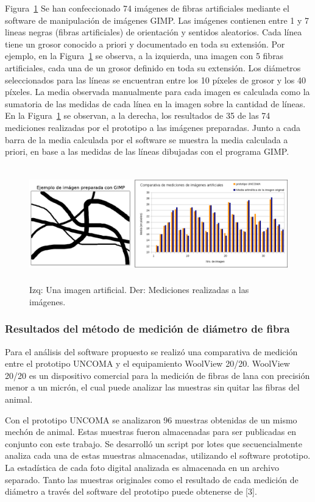 \documentclass[runningheads,a4paper]{llncs}
\begin{document}
Figura~\ref{fig:comparativa-artificial3}
Se han confeccionado 74 imágenes de fibras artificiales mediante el software de manipulación de imágenes GIMP. Las imágenes contienen entre 1 y 7 lineas negras (fibras artificiales) de orientación  y sentidos aleatorios. Cada línea tiene un grosor conocido a priori y documentado en toda su extensión. Por ejemplo, en la Figura~\ref{fig:comparativa-artificial3} se observa, a la izquierda, una imagen con 5 fibras artificiales, cada una de un grosor definido en toda su extensión. Los diámetros seleccionados para las líneas se encuentran entre los 10 píxeles de grosor y los 40 píxeles. La media observada manualmente para cada imagen es calculada como la sumatoria de las medidas de cada línea en la imagen sobre la cantidad de líneas.
En la Figura~\ref{fig:comparativa-artificial3} se observan, a la derecha, los resultados de 35 de las 74 mediciones realizadas por el prototipo a las imágenes preparadas. Junto a cada barra de la media calculada por el software se muestra la media calculada a priori, en base a las medidas de las líneas dibujadas con el programa GIMP.
\begin{figure}
\centering
\includegraphics[height=5cm]{comparativa-artificial3}
\caption{Izq: Una imagen artificial. Der: Mediciones realizadas a las imágenes.}
\label{fig:comparativa-artificial3}
\end{figure}


\subsubsection{Resultados del método de medición de diámetro de fibra} 

Para el análisis del software propuesto se realizó una comparativa de medición entre el prototipo UNCOMA y el equipamiento WoolView 20/20. 
WoolView 20/20 es un dispositivo comercial para la medición de fibras de lana con precisión menor a un micrón, el cual puede analizar las muestras sin quitar las fibras del animal. 

Con el prototipo UNCOMA se analizaron 96 muestras obtenidas de un mismo mechón de animal. Estas muestras fueron almacenadas para ser publicadas en conjunto con este trabajo. Se desarrolló un script por lotes que secuencialmente analiza cada una de estas muestras almacenadas, utilizando el software prototipo. La estadística de cada foto digital analizada es almacenada en un archivo separado. Tanto las muestras originales como el resultado de cada medición de diámetro a través del software del prototipo puede obtenerse de [3].
\end{document}
